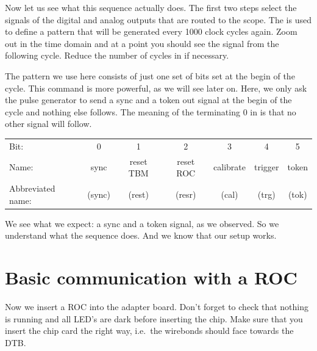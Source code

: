 Now let us see what this sequence actually does.  The first two steps select the signals of the digital and analog outputs that are routed to the scope. The  is used to define a pattern that will be generated every 1000 clock cycles again. Zoom out in the time domain and at a point you should see the signal from the following cycle. Reduce the number of cycles in  if necessary.

The pattern we use here consists of just one set of bits set at the begin of the cycle. This command is more powerful, as we will see later on. Here, we only ask the pulse generator to send a sync and a token out signal at the begin of the cycle and nothing else follows. The meaning of the terminating 0 in  is that no other signal will follow.
\begin{center}
\begin{tabular}{lcccccc}
    \toprule
Bit:  & 0 & 1 & 2 & 3 & 4 & 5 \\
Name: & sync & reset TBM & reset ROC & calibrate & trigger & token \\
Abbreviated name: & (sync) & (rest) & (resr) & (cal) & (trg) & (tok) \\
    \bottomrule
\end{tabular}
\end{center}

We see what we expect: a sync and a token signal, as we observed. So we understand what the sequence does. And we know that our setup works.



\section{Basic communication with a ROC}

Now we insert a ROC into the adapter board. Don't forget to check that nothing is running and all LED's are dark before inserting the chip. Make sure that you insert the chip card the right way, i.e.~the wirebonds should face towards the DTB.

